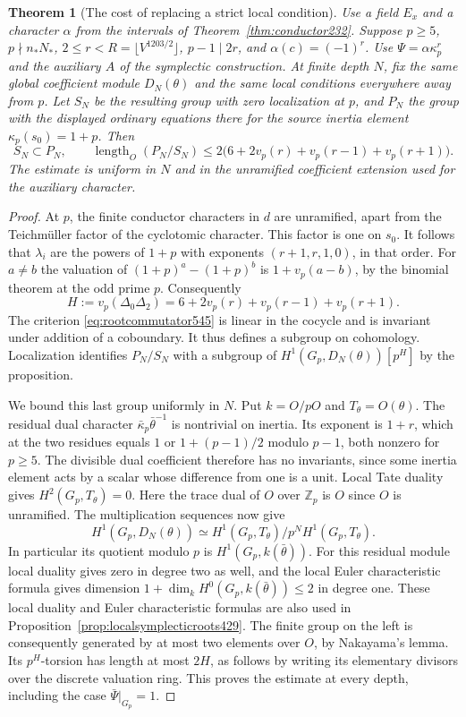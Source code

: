 \documentclass[a4paper,11pt]{article}
\newtheorem{theorem}[proposition]{Theorem}
\theoremstyle{definition}
\theoremstyle{remark}
\newcommand{\ZZ}{\mathbb Z}\newcommand{\ord}{\operatorname{ord}}
\numberwithin{equation}{section}
\begin{document}
\begin{theorem}[The cost of replacing a strict local condition]
\leavevmode\label{thm:strictordinary545}
Use a field \(E_x\) and a character \(\alpha\) from the intervals
of Theorem~\ref{thm:conductor232}. Suppose \(p\ge5\),
\(p\nmid n_*N_*\), \(2\le r<R=\lfloor V^{1203/2}\rfloor\),
\(p-1\mid2r\), and \(\alpha(c)=(-1)^r\). Use
\(\Psi=\alpha\kappa_p^r\) and the auxiliary \(A\) of the
symplectic construction. At finite depth \(N\), fix the same
global coefficient module \(D_N(\theta)\) and the same local
conditions everywhere away from \(p\). Let \(S_N\) be the
resulting group with zero localization at \(p\), and \(P_N\)
the group with the displayed ordinary equations there for the
source inertia element \(\kappa_p(s_0)=1+p\). Then
\[
  S_N\subset P_N,\qquad
  \operatorname{length}_O(P_N/S_N)
       \le 2\bigl(6+2v_p(r)+v_p(r-1)+v_p(r+1)\bigr).
\]
The estimate is uniform in \(N\) and in the unramified
coefficient extension used for the auxiliary character.
\end{theorem}
\begin{proof}
At \(p\), the finite conductor characters in \(d\) are
unramified, apart from the Teichmüller factor of the cyclotomic
character. This factor is one on \(s_0\). It follows that
\(\lambda_i\) are the powers of \(1+p\) with exponents
\((r+1,r,1,0)\), in that order. For \(a\ne b\) the valuation
of \((1+p)^a-(1+p)^b\) is \(1+v_p(a-b)\), by the binomial
theorem at the odd prime \(p\). Consequently
\[
     H:=v_p(\Delta_0\Delta_2)=6+2v_p(r)+v_p(r-1)+v_p(r+1).
\]
The criterion \eqref{eq:rootcommutator545} is linear in
the cocycle and is invariant under addition of a coboundary.
It thus defines a subgroup on cohomology. Localization
identifies \(P_N/S_N\) with a subgroup of
\(H^1(G_p,D_N(\theta))[p^H]\) by the proposition.

We bound this last group uniformly in \(N\). Put
\(k=O/pO\) and \(T_\theta=O(\theta)\). The residual dual
character \(\bar\kappa_p\bar\theta^{-1}\) is nontrivial on
inertia. Its exponent is \(1+r\), which at the two residues
equals \(1\) or \(1+(p-1)/2\) modulo \(p-1\), both nonzero
for \(p\ge5\). The divisible dual coefficient therefore has
no invariants, since some inertia element acts by a scalar
whose difference from one is a unit. Local Tate duality gives
\(H^2(G_p,T_\theta)=0\). Here the trace dual of \(O\) over
\(\ZZ_p\) is \(O\) since \(O\) is unramified. The
multiplication sequences now give
\[
       H^1(G_p,D_N(\theta))\simeq
          H^1(G_p,T_\theta)/p^NH^1(G_p,T_\theta).
\]
In particular its quotient modulo \(p\) is
\(H^1(G_p,k(\bar\theta))\). For this residual module local
duality gives zero in degree two as well, and the local Euler
characteristic formula gives dimension
\(1+\dim_k H^0(G_p,k(\bar\theta))\le2\) in degree one.
These local duality and Euler characteristic formulas are
also used in Proposition~\ref{prop:localsymplecticroots429}.
The finite group on the left is consequently generated by at
most two elements over \(O\), by Nakayama's lemma. Its
\(p^H\)-torsion has length at most \(2H\), as follows by
writing its elementary divisors over the discrete valuation
ring. This proves the estimate at every depth, including
the case \(\bar\Psi|_{G_p}=1\).
\end{proof}
\end{document}
